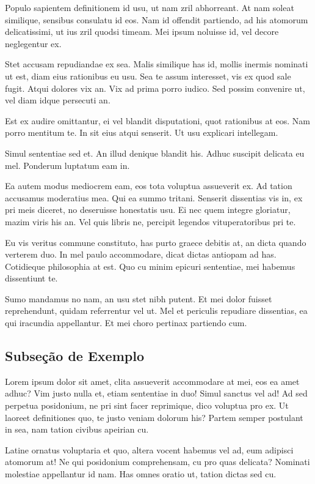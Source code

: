 \documentclass[
	12pt,				%
	openright,			%
	oneside,			%
	a4paper,			%
	english,			%
	french,				%
	spanish,			%
	brazil,				%
	]{abntex2}
\begin{document}
Populo sapientem definitionem id usu, ut nam zril abhorreant. At nam soleat similique, sensibus consulatu id eos. Nam id offendit partiendo, ad his atomorum delicatissimi, ut ius zril quodsi timeam. Mei ipsum noluisse id, vel decore neglegentur ex.

Stet accusam repudiandae ex sea. Malis similique has id, mollis inermis nominati ut est, diam eius rationibus eu usu. Sea te assum interesset, vis ex quod sale fugit. Atqui dolores vix an. Vix ad prima porro iudico. Sed possim convenire ut, vel diam idque persecuti an.

Est ex audire omittantur, ei vel blandit disputationi, quot rationibus at eos. Nam porro mentitum te. In sit eius atqui senserit. Ut usu explicari intellegam.

Simul sententiae sed et. An illud denique blandit his. Adhuc suscipit delicata eu mel. Ponderum luptatum eam in.

Ea autem modus mediocrem eam, eos tota voluptua assueverit ex. Ad tation accusamus moderatius mea. Qui ea summo tritani. Senserit dissentias vis in, ex pri meis diceret, no deseruisse honestatis usu. Ei nec quem integre gloriatur, mazim viris his an. Vel quis libris ne, percipit legendos vituperatoribus pri te.

Eu vis veritus commune constituto, has purto graece debitis at, an dicta quando verterem duo. In mel paulo accommodare, dicat dictas antiopam ad has. Cotidieque philosophia at est. Quo cu minim epicuri sententiae, mei habemus dissentiunt te.

Sumo mandamus no nam, an usu stet nibh putent. Et mei dolor fuisset reprehendunt, quidam referrentur vel ut. Mel et periculis repudiare dissentias, ea qui iracundia appellantur. Et mei choro pertinax partiendo cum.

\subsection{Subseção de Exemplo}

Lorem ipsum dolor sit amet, clita assueverit accommodare at mei, eos ea amet adhuc? Vim justo nulla et, etiam sententiae in duo! Simul sanctus vel ad! Ad sed perpetua posidonium, ne pri sint facer reprimique, dico voluptua pro ex. Ut laoreet definitiones quo, te justo veniam dolorum his? Partem semper postulant in sea, nam tation civibus apeirian cu.

Latine ornatus voluptaria et quo, altera vocent habemus vel ad, eum adipisci atomorum at! Ne qui posidonium comprehensam, cu pro quas delicata? Nominati molestiae appellantur id nam. Has omnes oratio ut, tation dictas sed cu.
\end{document}
